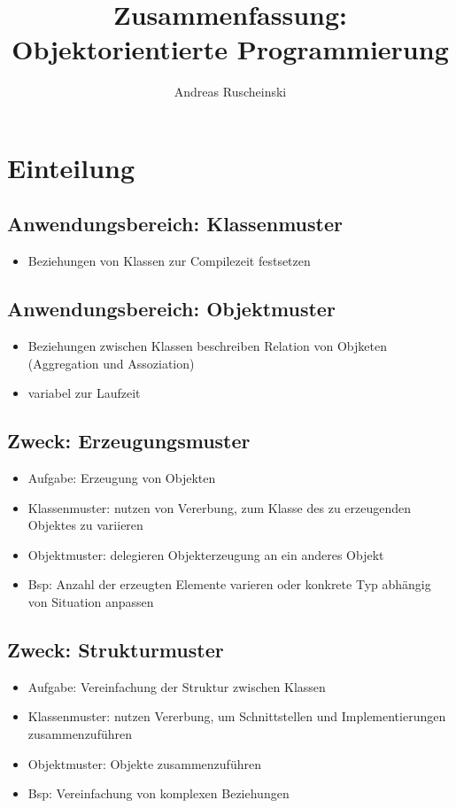 \documentclass[11pt, fleqn, a4paper, leqno]{scrartcl} %
\title{Zusammenfassung: Objektorientierte Programmierung}
\author{Andreas Ruscheinski}
\date{}
\begin{document}
\maketitle
\tableofcontents
	\section{Einteilung}
		\subsection{Anwendungsbereich: Klassenmuster}
			\begin{itemize}
				\item Beziehungen von Klassen zur Compilezeit festsetzen
			\end{itemize}
		\subsection{Anwendungsbereich: Objektmuster}
			\begin{itemize}
				\item Beziehungen zwischen Klassen beschreiben Relation von Objketen (Aggregation und Assoziation)
				\item variabel zur Laufzeit
			\end{itemize}
		\subsection{Zweck: Erzeugungsmuster}
			\begin{itemize}
				\item Aufgabe: Erzeugung von Objekten
				\item Klassenmuster: nutzen von Vererbung, zum Klasse des zu erzeugenden Objektes zu variieren
				\item Objektmuster: delegieren Objekterzeugung an ein anderes Objekt
				\item Bsp: Anzahl der erzeugten Elemente varieren oder konkrete Typ abhängig von Situation anpassen		
			\end{itemize}
		\subsection{Zweck: Strukturmuster}
			\begin{itemize}
				\item Aufgabe: Vereinfachung der Struktur zwischen Klassen
				\item Klassenmuster: nutzen Vererbung, um Schnittstellen und Implementierungen zusammenzuführen
				\item Objektmuster: Objekte zusammenzuführen
				\item Bsp: Vereinfachung von komplexen Beziehungen		
			\end{itemize}
\end{document}
